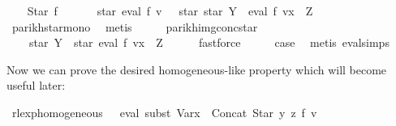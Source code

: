 \begin{isabellebody}
\isamarkupfalse%
\isanewline
\ \ \isamarkupfalse%
\ {\isacharparenleft}{\kern0pt}Star\ f{\isacharparenright}{\kern0pt}\isanewline
\ \ \isamarkupfalse%
\ \isamarkupfalse%
\ {\isachardoublequoteopen}{\isasymPsi}\ {\isacharparenleft}{\kern0pt}star\ {\isacharparenleft}{\kern0pt}eval\ f\ v{\isacharparenright}{\kern0pt}{\isacharparenright}{\kern0pt}\ {\isasymsubseteq}\ {\isasymPsi}\ {\isacharparenleft}{\kern0pt}star\ {\isacharparenleft}{\kern0pt}star\ Y\ {\isacharat}{\kern0pt}{\isacharat}{\kern0pt}\ eval\ f\ {\isacharparenleft}{\kern0pt}v{\isacharparenleft}{\kern0pt}x\ {\isacharcolon}{\kern0pt}{\isacharequal}{\kern0pt}\ Z{\isacharparenright}{\kern0pt}{\isacharparenright}{\kern0pt}{\isacharparenright}{\kern0pt}{\isacharparenright}{\kern0pt}{\isachardoublequoteclose}\isanewline
\ \ \ \ \isamarkupfalse%
\ parikh{\isacharunderscore}{\kern0pt}star{\isacharunderscore}{\kern0pt}mono\ \isamarkupfalse%
\ metis\isanewline
\ \ \isamarkupfalse%
\ \isamarkupfalse%
\ parikh{\isacharunderscore}{\kern0pt}img{\isacharunderscore}{\kern0pt}conc{\isacharunderscore}{\kern0pt}star\ \isamarkupfalse%
\ {\isachardoublequoteopen}{\isasymdots}\ {\isasymsubseteq}\ {\isasymPsi}\ {\isacharparenleft}{\kern0pt}star\ Y\ {\isacharat}{\kern0pt}{\isacharat}{\kern0pt}\ star\ {\isacharparenleft}{\kern0pt}eval\ f\ {\isacharparenleft}{\kern0pt}v{\isacharparenleft}{\kern0pt}x\ {\isacharcolon}{\kern0pt}{\isacharequal}{\kern0pt}\ Z{\isacharparenright}{\kern0pt}{\isacharparenright}{\kern0pt}{\isacharparenright}{\kern0pt}{\isacharparenright}{\kern0pt}{\isachardoublequoteclose}\isanewline
\ \ \ \ \isamarkupfalse%
\ fastforce\isanewline
\ \ \isamarkupfalse%
\ \isamarkupfalse%
\ {\isacharquery}{\kern0pt}case\ \isamarkupfalse%
\ {\isacharparenleft}{\kern0pt}metis\ eval{\isachardot}{\kern0pt}simps{\isacharparenleft}{\kern0pt}{}{\isacharparenright}{\kern0pt}{\isacharparenright}{\kern0pt}\isanewline
{}\isamarkupfalse%
%
\endisatagproof
{\isafoldproof}%
%
\isadelimproof
%
\endisadelimproof
%
\begin{isamarkuptext}%
Now we can prove the desired homogeneous-like property which will become useful later:%
\end{isamarkuptext}\isamarkuptrue%
\isamarkupfalse%
\ rlexp{\isacharunderscore}{\kern0pt}homogeneous{\isacharcolon}{\kern0pt}\ \ {\isachardoublequoteopen}{\isasymPsi}\ {\isacharparenleft}{\kern0pt}eval\ {\isacharparenleft}{\kern0pt}subst\ {\isacharparenleft}{\kern0pt}Var{\isacharparenleft}{\kern0pt}x\ {\isacharcolon}{\kern0pt}{\isacharequal}{\kern0pt}\ Concat\ {\isacharparenleft}{\kern0pt}Star\ y{\isacharparenright}{\kern0pt}\ z{\isacharparenright}{\kern0pt}{\isacharparenright}{\kern0pt}\ f{\isacharparenright}{\kern0pt}\ v{\isacharparenright}{\kern0pt}\isanewline

\end{isabellebody}
